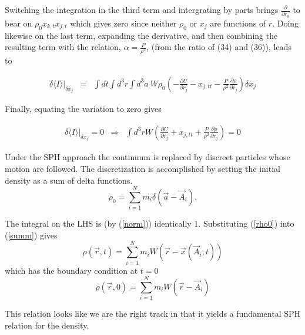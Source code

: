 Switching the integration in the third term and intergrating by parts brings $\frac{\partial}{\partial r_k}$ to bear on $\rho_0 x_{k,t} x_{j,t}$ which gives zero since neither $\rho_0$ or $x_j$ are functions of $r$.  Doing likewise on the last term, expanding the derivative,  and then combining the resulting term with the relation, $\alpha = \frac{P}{\rho^2}$, (from the ratio of (34) and (36)), leads to 

\begin{eqnarray}
\delta \langle I \rangle \vert_{\delta x_j} & = & \int dt\! \int d^3r\! \int d^3a\:
	W \rho_0
	\left(	
		-\frac{\partial U}{\partial r_j}
		-x_{j,tt}
		-\frac{P}{\rho^2} \frac{\partial \rho}{\partial r_j}
 	\right) 
	\delta x_j
\end{eqnarray}

Finally, equating the variation to zero gives

\begin{eqnarray}\label{fin_var}
\delta \langle I \rangle \vert_{\delta x_j} = 0 & \Rightarrow & \int d^3r\! 
	W
	\left(	
		\frac{\partial U}{\partial r_j}
		+ x_{j,tt}
		+ \frac{P}{\rho^2} \frac{\partial \rho}{\partial r_j}
 	\right)  
	= 0
\end{eqnarray}

Under the SPH approach the continuum is replaced by discreet particles whose motion are followed.  The discretization is accomplished by setting the initial density as a sum of delta functions.  
\begin{equation}\label{rho0}
\rho_0 = \sum_{i=1}^{N} m_i \delta({\vec a} - {\vec A}_i).
\end{equation}

The integral on the LHS is (by (\ref{norm})) identically 1.  Substituting (\ref{rho0}) into (\ref{summ}) gives
\begin{equation}
\rho({\vec r},t) = \sum_{i=1}^{N} m_i W({\vec r} - {\vec x}({\vec A}_i,t))
\end{equation}
which has the boundary condition at $t=0$
\begin{equation}
\rho({\vec r},0) = \sum_{i=1}^{N} m_i W({\vec r} - {\vec A}_i)
\end{equation}

This relation looks like we are the right track in that it yields a fundamental SPH relation for the density.



